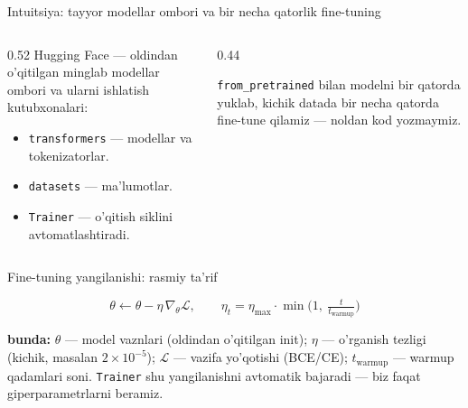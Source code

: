 \documentclass[aspectratio=169,11pt]{beamer}
\newcommand{\bunda}[1]{{\small\textbf{bunda:}\; #1}}
\begin{document}
\begin{frame}{Intuitsiya: tayyor modellar ombori va bir necha qatorlik fine-tuning}
  \begin{columns}[T]
    \begin{column}{0.52\textwidth}
      \small
      Hugging Face --- oldindan o'qitilgan minglab modellar ombori va ularni
      ishlatish kutubxonalari:
      \begin{itemize}\setlength\itemsep{1pt}
        \item \texttt{transformers} --- modellar va tokenizatorlar.
        \item \texttt{datasets} --- ma'lumotlar.
        \item \texttt{Trainer} --- o'qitish siklini avtomatlashtiradi.
      \end{itemize}
    \end{column}
    \begin{column}{0.44\textwidth}
      \begin{tcolorbox}[okbox,top=2pt,bottom=2pt]
        \footnotesize
        \texttt{from\_pretrained} bilan modelni bir qatorda yuklab, kichik
        datada bir necha qatorda fine-tune qilamiz --- noldan kod yozmaymiz.
      \end{tcolorbox}
    \end{column}
  \end{columns}
\end{frame}

\begin{frame}{Fine-tuning yangilanishi: rasmiy ta'rif}
  \begin{tcolorbox}[defbox,title={Ta'rif: gradient yangilanishi va warmup}]
    \vspace{-0.4em}
    $$ \theta \leftarrow \theta - \eta\,\nabla_\theta \mathcal{L}, \qquad
       \eta_t = \eta_{\max}\cdot\min\!\Big(1,\ \tfrac{t}{t_{\mathrm{warmup}}}\Big) $$
  \end{tcolorbox}
  \vspace{2pt}
  \bunda{$\theta$ --- model vaznlari (oldindan o'qitilgan init); $\eta$ ---
  o'rganish tezligi (kichik, masalan $2\times 10^{-5}$); $\mathcal{L}$ --- vazifa
  yo'qotishi (BCE/CE); $t_{\mathrm{warmup}}$ --- warmup qadamlari soni.}
  \vspace{4pt}
  \footnotesize \texttt{Trainer} shu yangilanishni avtomatik bajaradi ---
  biz faqat giperparametrlarni beramiz.
\end{frame}
\end{document}
